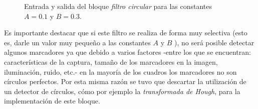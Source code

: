 \begin{figure}[H]
  \caption{Entrada y salida del bloque \emph{filtro circular} para las constantes $A = 0.1$ y $B = 0.3$.}
      \label{ejemplofiltrocirc}
\end{figure}

Es importante destacar que si este filtro se realiza de forma muy selectiva (esto es, darle un valor muy pequeño a las constantes $A$ y $B$ ), no será posible detectar algunos marcadores ya que debido a varios factores -entre los que se encuentran: características de la captura, tamaño de los marcadores en la imagen, iluminación, ruido, etc.- en la mayoría de los cuadros los marcadores no son círculos perfectos. Por esta misma razón se tuvo que descartar la utilización de un detector de círculos, cómo por ejemplo la \textit{transformada de Hough}\cite{hough}, para la implementación de este bloque. 

